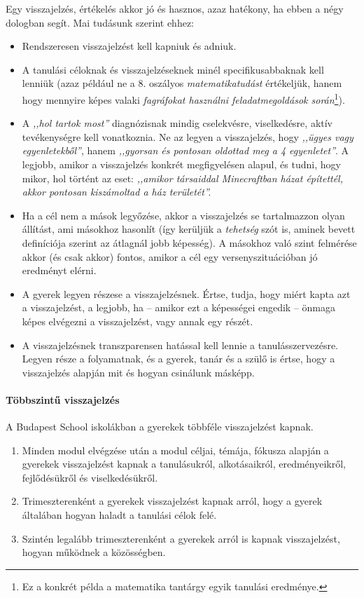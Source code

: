 Egy visszajelzés, értékelés akkor jó és hasznos, azaz hatékony, ha ebben a négy dologban segít. Mai tudásunk szerint ehhez:
\begin{itemize}
      \item Rendszeresen visszajelzést kell kapniuk és adniuk.
      \item A tanulási céloknak és visszajelzéseknek minél specifikusabbaknak kell lenniük (azaz például ne a 8. oszályos \emph{matematikatudást} értékeljük, hanem hogy mennyire képes valaki \emph{fagráfokat használni feladatmegoldások során}\footnote{Ez a konkrét példa a matematika tantárgy egyik tanulási eredménye.}).
      \item A \emph{,,hol tartok most''} diagnózisnak mindig cselekvésre, viselkedésre, aktív tevékenységre kell vonatkoznia. Ne az legyen a visszajelzés, hogy \emph{,,ügyes vagy egyenletekből''}, hanem \emph{,,gyorsan és       pontosan oldottad meg a 4 egyenletet''}. A legjobb, amikor a visszajelzés konkrét megfigyelésen alapul, és tudni, hogy mikor, hol történt az eset: \emph{,,amikor társaiddal Minecraftban házat építettél, akkor       pontosan kiszámoltad a ház területét''.}
      \item Ha a cél nem a mások legyőzése, akkor a visszajelzés se tartalmazzon olyan állítást, ami másokhoz hasonlít (így kerüljük a \emph{tehetség} szót is, aminek bevett definíciója szerint az átlagnál jobb képesség). A másokhoz való szint felmérése akkor (és csak akkor) fontos, amikor a cél egy versenyszituációban jó eredményt elérni.

      \item A gyerek legyen részese a visszajelzésnek. Értse, tudja, hogy miért kapta azt a visszajelzést, a legjobb, ha -- amikor ezt a képességei engedik -- önmaga képes elvégezni a visszajelzést, vagy annak egy részét.
      \item A visszajelzésnek transzparensen hatással kell lennie a tanulásszervezésre. Legyen része a folyamatnak, és a gyerek, tanár és a szülő is értse, hogy a visszajelzés alapján mit és hogyan csinálunk másképp.
\end{itemize}

\paragraph{Többszintű visszajelzés} A Budapest School iskolákban a gyerekek
többféle visszajelzést kapnak. \begin{enumerate}
      \item Minden modul elvégzése után a modul céljai, témája, fókusza alapján a gyerekek visszajelzést kapnak a tanulásukról, alkotásaikról, eredményeikről, fejlődésükről és viselkedésükről.
      \item Trimeszterenként a gyerekek visszajelzést kapnak arról, hogy a gyerek általában hogyan haladt a tanulási célok felé.
      \item Szintén legalább trimeszterenként a gyerekek arról is kapnak visszajelzést, hogyan működnek a közösségben.
\end{enumerate}


